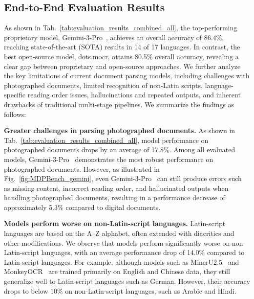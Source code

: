 \documentclass[runningheads]{llncs}
\begin{document}
\subsection{End-to-End Evaluation Results}

As shown in Tab.~\ref{tab:evaluation_results_combined_all}, the top-performing proprietary model, Gemini-3-Pro~\cite{gemini3pro}, achieves an overall accuracy of 86.4\%, reaching state-of-the-art (SOTA) results in 14 of 17 languages. In contrast, the best open-source model, dots.mocr, attains 80.5\% overall accuracy, revealing a clear gap between proprietary and open-source approaches. We further analyze the key limitations of current document parsing models, including challenges with photographed documents, limited recognition of non-Latin scripts, language-specific reading order issues, hallucinations and repeated outputs, and inherent drawbacks of traditional multi-stage pipelines. We summarize the findings as follows:

\textbf{Greater challenges in parsing photographed documents.} As shown in Tab.~\ref{tab:evaluation_results_combined_all}, model performance on photographed documents drops by an average of 17.8\%. Among all evaluated models, Gemini-3-Pro~\cite{gemini3pro} demonstrates the most robust performance on photographed documents. However, as illustrated in Fig.~\ref{fig:MDPBench_gemini}, even Gemini-3-Pro~\cite{gemini3pro} can still produce errors such as missing content, incorrect reading order, and hallucinated outputs when handling photographed documents, resulting in a performance decrease of approximately 5.3\% compared to digital documents. 



\textbf{Models perform worse on non-Latin-script languages.} Latin-script languages are based on the A–Z alphabet, often extended with diacritics and other modifications. We observe that models perform significantly worse on non-Latin-script languages, with an average performance drop of 14.0\% compared to Latin-script languages. For example, although models such as MinerU2.5~\cite{mineru2.5} and MonkeyOCR~\cite{monkeyocr} are trained primarily on English and Chinese data, they still generalize well to Latin-script languages such as German. However, their accuracy drops to below 10\% on non-Latin-script languages, such as Arabic and Hindi.
\end{document}
